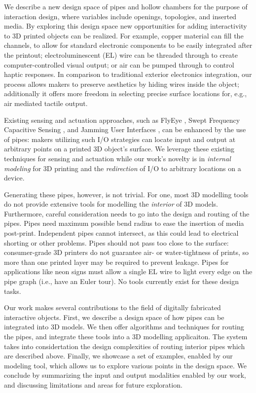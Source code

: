 We describe a new design space of pipes and hollow chambers for the purpose of interaction design, where variables include openings, topologies, and inserted media. By exploring this design space new opportunities for adding interactivity to 3D printed objects can be realized. For example, copper material can fill the channels, to allow for standard electronic components to be easily integrated after the printout; electroluminescent (EL) wire can be threaded through to create computer-controlled visual output; or air can be pumped through to control haptic responses.  In comparison to traditional exterior electronics integration, our process allows makers to preserve aesthetics by hiding wires inside the object; additionally it offers more freedom in selecting precise surface locations for, e.g., air mediated tactile output.

Existing sensing and actuation approaches, such as FlyEye \cite{Wimmer-flyeye}, Swept Frequency Capacitive Sensing \cite{Sato-touche}, and Jamming User Interfaces \cite{Follmer-jamming}, can be enhanced by the use of pipes: makers utilizing such I/O strategies can locate input and output at arbitrary points on a printed 3D object's surface.  We leverage these existing techniques for sensing and actuation while our work's novelty is in \emph{internal modeling} for 3D printing and the \emph{redirection} of I/O to arbitrary locations on a device.

Generating these pipes, however, is not trivial.  For one, most 3D modelling tools do not provide extensive tools for modelling the  {\em interior} of 3D models. Furthermore, careful consideration needs to go into the design and routing of the pipes. Pipes need maximum possible bend radius to ease the insertion of media post-print.  Independent pipes cannot intersect, as this could lead to electrical shorting or other problems.  Pipes should not pass too close to the surface: consumer-grade 3D printers do not guarantee air- or water-tightness of prints, so more than one printed layer may be required to prevent leakage.  Pipes for applications like neon signs must allow a single EL wire to light every edge on the pipe graph (i.e., have an Euler tour).  No tools currently exist for these design tasks.  

Our work makes several contributions to the field of digitally fabricated interactive objects. First, we describe a design space of how pipes can be integrated into 3D models. We then offer algorithms and techniques for routing the pipes, and integrate these tools into  a 3D modelling applicaiton. The system takes into considertation the design complexities of routing interior pipes which are described above. Finally, we showcase a set of examples, enabled by our modeling tool, which allows us to explore various points in the design space. We conclude by summarizing the input and output modalities enabled by our work, and discussing limitations and areas for future exploration. 
